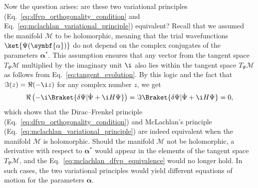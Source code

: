 Now the question arises: are these two variational principles (Eq.~\eqref{eq:dfvp_orthogonality_condition} and Eq.~\eqref{eq:mclachlan_variational_principle}) equivalent? Recall that we assumed the manifold $\mathcal{M}$ to be holomorphic, meaning that the trial wavefunctions $\ket{\Psi(\symbf{\alpha})}$ do not depend on the complex conjugates of the parameters $\symbf{\alpha}^\ast$. This assumption ensures that any vector from the tangent space $T_{\Psi}\mathcal{M}$ multiplied by the imaginary unit $\i$ also lies within the tangent space $T_{\Psi}\mathcal{M}$ as follows from Eq.~\eqref{eq:tangent_evolution}. By this logic and the fact that $\Im(z)=\Re(-\i z)$ for any complex number $z$, we get
\begin{equation}\label{eq:mclachlan_dfvp_equivalence}
\Re\left(-\i\Braket{\delta\Psi|\dot\Psi+\i H\Psi}\right)=\Im\Braket{\delta\Psi|\dot\Psi+\i H\Psi}=0,
\end{equation}
which shows that the Dirac--Frenkel principle (Eq.~\eqref{eq:dfvp_orthogonality_condition}) and McLachlan's principle (Eq.~\eqref{eq:mclachlan_variational_principle}) are indeed equivalent when the manifold $\mathcal{M}$ is holomorphic. Should the manifold $\mathcal{M}$ not be holomorphic, a derivative with respect to $\symbf{\alpha}^\ast$ would appear in the elements of the tangent space $T_{\Psi}\mathcal{M}$, and the Eq.~\eqref{eq:mclachlan_dfvp_equivalence} would no longer hold. In such cases, the two variational principles would yield different equations of motion for the parameters $\symbf{\alpha}$.\supercite{297500112}
